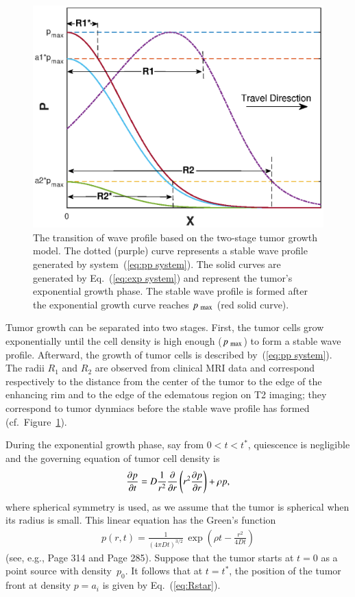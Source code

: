 \documentclass{aims}
\numberwithin{equation}{section}
\begin{document}
\begin{figure}
\begin{center}
\includegraphics[scale=0.90]{plots/wave.eps}
\caption{The transition of wave profile based on the two-stage tumor growth model. The
dotted (purple) curve represents a stable wave profile generated by
system~(\ref{eq:pp system}). The solid curves are generated by Eq.~(\ref{eq:exp system})
and represent the tumor's exponential growth phase.
The stable wave profile is formed after the exponential growth curve reaches
$p_{\mbox{\scriptsize max}}$ (red solid curve).}
\end{center}
\label{fig:wave}
\end{figure}

Tumor growth can be separated into two stages. First, the tumor cells grow exponentially
until the cell density is high enough ($p_{\mbox{\scriptsize max}}$) to form 
a stable wave profile. Afterward, the growth of tumor cells is described
by~(\ref{eq:pp system}).
The radii $R_1$ and $R_2$ are observed from clinical MRI data and correspond respectively
to the
distance from the center of the tumor to the edge of the enhancing rim and to the edge
of the edematous region on T2 imaging; they correspond to tumor dynmiacs
before the stable wave profile has formed (cf.\ Figure~\ref{fig:wave}). 

During the exponential growth phase, say from $0<t<t^*$, quiescence is negligible and the governing equation of tumor cell density is 
\begin{eqnarray}\label{eq:exp system}
\frac{\partial p}{\partial t} =  D\frac{1}{r^2} \frac{\partial}{\partial r} \left(r^2 \frac{\partial p}{\partial r}\right) + \rho p,
\end{eqnarray}
where spherical symmetry is used, as we assume that the tumor is spherical when
its radius is small.
This linear equation has the Green's function 
\begin{eqnarray}
p(r,t)=\frac{1}{(4 \pi D t)^{3/2}}\, \exp\left(\rho t - \frac{r^2}{4Dt}\right) 
\end{eqnarray}
(see, e.g., \cite{KotBook} Page 314 and \cite{BrittonBook} Page 285).
Suppose that the tumor starts at $t=0$ as a point source with density~$p_0$.
It follows that at $t=t^*$, the position of the tumor front at density $p=a_i$  is 
given by Eq.~(\ref{eq:Rstar}). 
\end{document}
